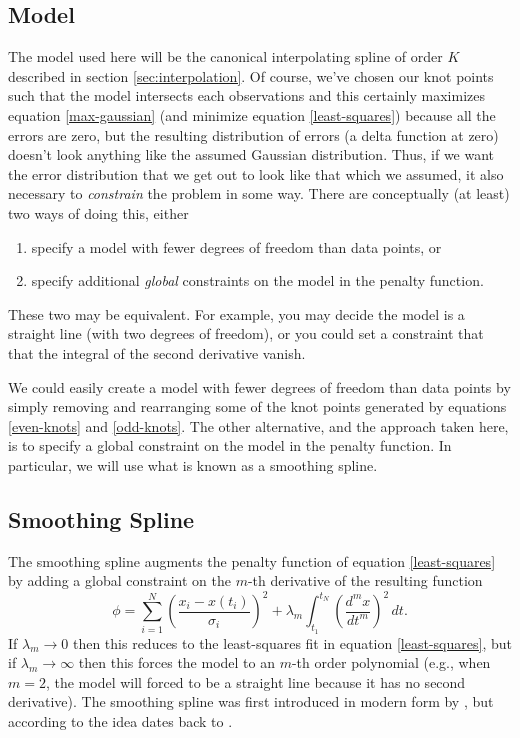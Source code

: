 \documentclass[10pt,journal]{IEEEtran}
\begin{document}
\subsection{Model}

The model used here will be the canonical interpolating spline of order $K$ described in section \ref{sec:interpolation}. Of course, we've chosen our knot points such that the model intersects each observations and this certainly maximizes equation \ref{max-gaussian} (and minimize equation \ref{least-squares}) because all the errors are zero, but the resulting distribution of errors (a delta function at zero) doesn't look anything like the assumed Gaussian distribution. Thus, if we want the error distribution that we get out to look like that which we assumed, it also necessary to \emph{constrain} the problem in some way. There are conceptually (at least) two ways of doing this, either 
\begin{enumerate}
\item specify a model with fewer degrees of freedom than data points, or
\item specify additional \emph{global} constraints on the model in the penalty function.
\end{enumerate}
These two may be equivalent. For example, you may decide the model is a straight line (with two degrees of freedom), or you could set a constraint that that the integral of the second derivative vanish.

We could easily create a model with fewer degrees of freedom than data points by simply removing and rearranging  some of the knot points generated by equations \ref{even-knots} and \ref{odd-knots}. The other alternative, and the approach taken here, is to specify a global constraint on the model in the penalty function. In particular, we will use what is known as a smoothing spline.

\subsection{Smoothing Spline}

The smoothing spline augments the penalty function of equation \ref{least-squares} by adding a global constraint on the $m$-th derivative of the resulting function
\begin{equation}
\label{smoothing-spline}
\phi =  \sum_{i=1}^{N} \left( \frac{x_i - x(t_i)}{\sigma_i} \right) ^2 + \lambda_m \int_{t_1}^{t_N} \left(\frac{d^m x}{dt^m}\right)^2 \, dt.
\end{equation}
If $\lambda_m \rightarrow 0$ then this reduces to the least-squares fit in equation \ref{least-squares}, but if $\lambda_m \rightarrow \infty$ then this forces the model to an $m$-th order polynomial (e.g., when $m=2$, the model will forced to be a straight line because it has no second derivative). The smoothing spline was first introduced in modern form by \cite{reinsch1967-nm}, but according to \cite{deboor1978-book} the idea dates back to \cite{whittaker1923-pems}.
\end{document}
